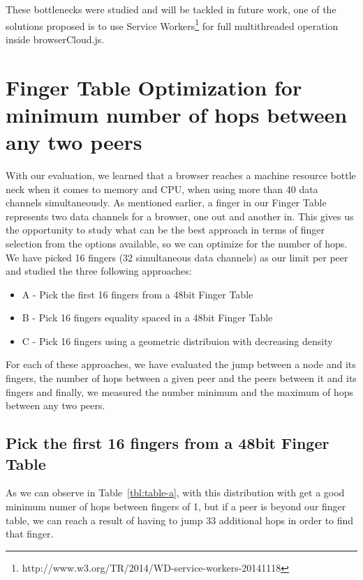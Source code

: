 These bottlenecks were studied and will be tackled in future work, one of the solutions proposed is to use Service Workers\footnote{http://www.w3.org/TR/2014/WD-service-workers-20141118} for full multithreaded operation inside browserCloud.js.

\section{Finger Table Optimization for minimum number of hops between any two peers}

With our evaluation, we learned that a browser reaches a machine resource bottle neck when it comes to memory and CPU, when using more than 40 data channels simultaneously. As mentioned earlier, a finger in our Finger Table represents two data channels for a browser, one out and another in. This gives us the opportunity to study what can be the best approach in terms of finger selection from the options available, so we can optimize for the number of hops. We have picked 16 fingers (32 simultaneous data channels) as our limit per peer and studied the three following approaches:


\begin{itemize}
    \item A - Pick the first 16 fingers from a 48bit Finger Table
    \item B - Pick 16 fingers equality spaced in a 48bit Finger Table
    \item C - Pick 16 fingers using a geometric distribuion with decreasing density
\end{itemize}

For each of these approaches, we have evaluated the jump between a node and its fingers, the number of hops between a given peer and the peers between it and its fingers and finally, we measured the number minimum and the maximum of hops between any two peers.

\subsection{Pick the first 16 fingers from a 48bit Finger Table}

As we can observe in Table~\ref{tbl:table-a}, with this distribution with get a good minimum numer of hops between fingers of 1, but if a peer is beyond our finger table, we can reach a result of having to jump 33 additional hops in order to find that finger.


